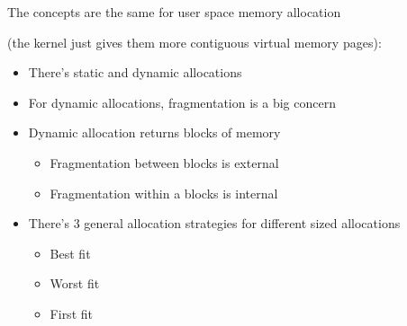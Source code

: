 \begin{slide}


    The concepts are the same for user space memory allocation

    (the kernel just gives them more contiguous virtual memory pages):

    \begin{itemize}
      \item There's static and dynamic allocations
      \item For dynamic allocations, fragmentation is a big concern
      \item Dynamic allocation returns blocks of memory
        \begin{itemize}
          \item Fragmentation between blocks is external
          \item Fragmentation within a blocks is internal
        \end{itemize}
      \item There's 3 general allocation strategies for different sized
            allocations
        \begin{itemize}
          \item Best fit
          \item Worst fit
          \item First fit
        \end{itemize}
    \end{itemize}

\end{slide}
  

